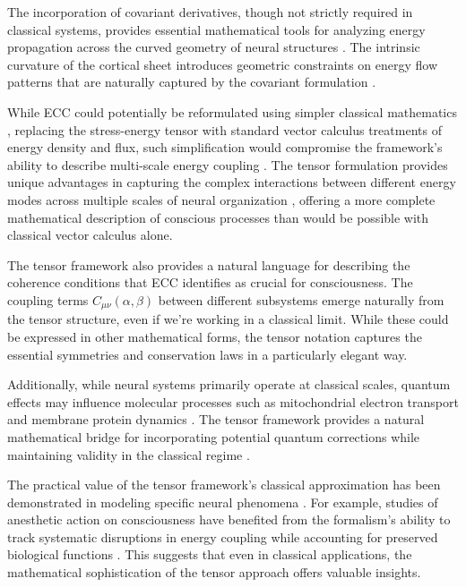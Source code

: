 \begin{refsection}
The incorporation of covariant derivatives, though not strictly required in classical systems, provides essential mathematical tools for analyzing energy propagation across the curved geometry of neural structures \cite{rosen2012anticipatory, merleau2012phenomenology}. The intrinsic curvature of the cortical sheet introduces geometric constraints on energy flow patterns that are naturally captured by the covariant formulation \cite{thompson2014waking}.

While ECC could potentially be reformulated using simpler classical mathematics \cite{varela2016embodied}, replacing the stress-energy tensor with standard vector calculus treatments of energy density and flux, such simplification would compromise the framework's ability to describe multi-scale energy coupling \cite{koch2019feeling}. The tensor formulation provides unique advantages in capturing the complex interactions between different energy modes across multiple scales of neural organization \cite{rovelli2018order}, offering a more complete mathematical description of conscious processes than would be possible with classical vector calculus alone.

The tensor framework also provides a natural language for describing the coherence conditions that ECC identifies as crucial for consciousness. The coupling terms $C_{\mu\nu}(\alpha, \beta)$ between different subsystems emerge naturally from the tensor structure, even if we're working in a classical limit. While these could be expressed in other mathematical forms, the tensor notation captures the essential symmetries and conservation laws in a particularly elegant way.

Additionally, while neural systems primarily operate at classical scales, quantum effects may influence molecular processes such as mitochondrial electron transport and membrane protein dynamics \cite{penrose2016fashion, koch2019feeling}. The tensor framework provides a natural mathematical bridge for incorporating potential quantum corrections while maintaining validity in the classical regime \cite{rosen2012anticipatory}.

The practical value of the tensor framework's classical approximation has been demonstrated in modeling specific neural phenomena \cite{thompson2014waking}. For example, studies of anesthetic action on consciousness have benefited from the formalism's ability to track systematic disruptions in energy coupling while accounting for preserved biological functions \cite{feinberg2016ancient}. This suggests that even in classical applications, the mathematical sophistication of the tensor approach offers valuable insights.


\end{refsection}
